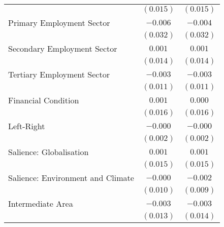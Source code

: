 \begin{center}
\begin{tiny}
\begin{longtable}{l@{} c@{} c@{}}
                                                                            & $(0.015)$       & $(0.015)$        \\
\quad Primary Employment Sector                                             & $-0.006$        & $-0.004$         \\
                                                                            & $(0.032)$       & $(0.032)$        \\
\quad Secondary Employment Sector                                           & $0.001$         & $0.001$          \\
                                                                            & $(0.014)$       & $(0.014)$        \\
\quad Tertiary Employment Sector                                            & $-0.003$        & $-0.003$         \\
                                                                            & $(0.011)$       & $(0.011)$        \\
\quad Financial Condition                                                   & $0.001$         & $0.000$          \\
                                                                            & $(0.016)$       & $(0.016)$        \\
\quad Left-Right                                                            & $-0.000$        & $-0.000$         \\
                                                                            & $(0.002)$       & $(0.002)$        \\
\quad Salience: Globalisation                                               & $0.001$         & $0.001$          \\
                                                                            & $(0.015)$       & $(0.015)$        \\
\quad Salience: Environment and Climate                                     & $-0.000$        & $-0.002$         \\
                                                                            & $(0.010)$       & $(0.009)$        \\
\quad Intermediate Area                                                     & $-0.003$        & $-0.003$         \\
                                                                            & $(0.013)$       & $(0.014)$        \\

\end{longtable}
\end{tiny}
\end{center}
